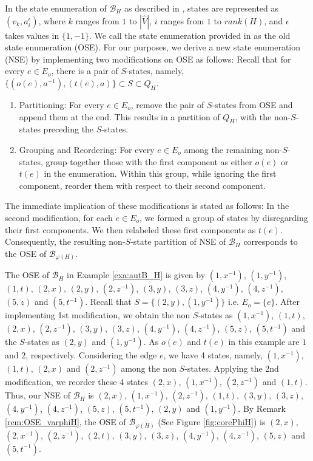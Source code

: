 \documentclass{article}
\newcommand{\B}{\mathcal{B}}
\newcommand{\e}{\epsilon}
\begin{document}
     In the state enumeration of $\B_H$ as described in \cite{DGS2021}, states are represented as $(v_k,a_i^{\e})$, where $k$ ranges from $1$ to $|\widehat{V}|$, $i$ ranges from $1$ to $rank(H)$, and $\e$ takes values in $\{1,-1\}$. We call the state enumeration provided in \cite{DGS2021} as the old state enumeration (OSE). For our purposes, we derive a new state enumeration (NSE) by implementing two modifications on OSE as follows:
     Recall that for every $e \in E_o$, there is a pair of $S$-states, namely, $\{(o(e),a^{-1}), (t(e),a)\} \subset S \subset Q_H.$
     \begin{enumerate}
        \item Partitioning: For every $e \in E_o$, remove the pair of $S$-states from OSE and append them at the end. This results in a partition of $Q_H$, with the non-$S$-states preceding the $S$-states. 
        \item Grouping and Reordering: For every $e \in E_o$ among the remaining non-$S$-states, group together those with the first component as either $o(e)$ or $t(e)$ in the enumeration. Within this group, while ignoring the first component, reorder them with respect to their second component.  
     \end{enumerate}
     The immediate implication of these modifications is stated as follows:
     {\myrem \label{rem:OSE_varphiH} In the second modification, for each $e \in E_o$, we formed a group of states by disregarding their first components. We then relabeled these first components as $t(e)$. Consequently, the resulting non-$S$-state partition of NSE of $\B_H$ corresponds to the OSE of $\B_{\varphi(H)}$.}
     
     {\myexa \label{exa:enumeration} The OSE of $\B_H$ in Example \ref{exa:autB_H} is given by $(1,x^{-1})$, $(1,y^{-1})$, $(1,t)$, $(2,x)$, $(2,y)$, $(2,z^{-1})$, $(3,y)$, $(3,z)$, $(4,y^{-1})$, $(4,z^{-1})$, $(5,z)$ and $(5,t^{-1})$. Recall that $S = \{(2,y),(1,y^{-1})\}$ i.e. $E_o = \{e\}$.
     After implementing 1st modification, we obtain the non $S$-states as $(1,x^{-1})$, $(1,t)$, $(2,x)$, $(2,z^{-1})$, $(3,y)$, $(3,z)$, $(4,y^{-1})$, $(4,z^{-1})$, $(5,z)$, $(5,t^{-1})$ and the $S$-states as $(2,y)$ and $(1,y^{-1})$. As $o(e)$ and $t(e)$ in this example are $1$ and $2$, respectively. Considering the edge $e$, we have 4 states, namely, $(1,x^{-1})$, $(1,t)$, $(2,x)$ and $(2,z^{-1})$ among the non $S$-states. Applying the 2nd modification, we reorder these 4 states $(2,x)$, $(1,x^{-1})$, $(2,z^{-1})$ and $(1,t)$. Thus, our NSE of $\B_H$ is $(2,x)$, $(1,x^{-1})$, $(2,z^{-1})$, $(1,t)$, $(3,y)$, $(3,z)$, $(4,y^{-1})$, $(4,z^{-1})$, $(5,z)$, $(5,t^{-1})$, $(2,y)$ and $(1,y^{-1})$. By Remark \ref{rem:OSE_varphiH}, the OSE of $\B_{\varphi(H)}$ (See Figure \ref{fig:corePhiH}) is $(2,x)$, $(2,x^{-1})$,  $(2,z^{-1})$, $(2,t)$, $(3,y)$, $(3,z)$, $(4,y^{-1})$, $(4,z^{-1})$, $(5,z)$ and $(5,t^{-1})$.} 
     
\end{document}
